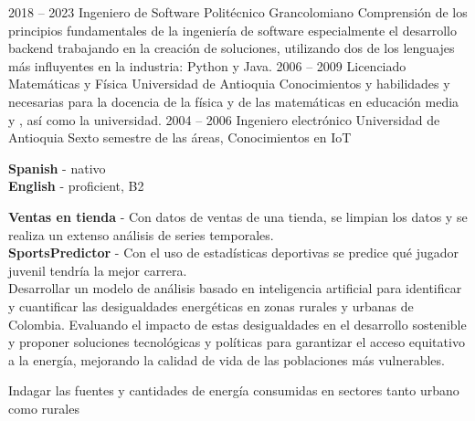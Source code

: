 \documentclass[9pt]{developercv} %
\begin{document}


\begin{entrylist}
	\entry
		{2018 -- 2023}
		{Ingeniero de Software}
		{Politécnico Grancolomiano}
		{Comprensión de los principios fundamentales de la ingeniería de software especialmente el desarrollo backend trabajando en la creación de soluciones, utilizando dos de los lenguajes más influyentes en la industria: Python y Java.}
	\entry
		{2006 -- 2009}
		{Licenciado Matemáticas y Física}
		{Universidad de Antioquia}
		{Conocimientos y habilidades y necesarias para la docencia de la física y de las matemáticas en educación media y , así como la universidad.  }
	\entry
		{2004 -- 2006}
		{Ingeniero electrónico}
		{Universidad de Antioquia }
		{Sexto semestre de las áreas, Conocimientos en IoT}
\end{entrylist}


\begin{minipage}[t]{0.4\textwidth}
	\vspace{-\baselineskip} %

	
	\textbf{Spanish} - nativo\\	
	\textbf{English} - proficient, B2\\
	
\end{minipage}
\hfill
\begin{minipage}[t]{0.6\textwidth}
	\vspace{-\baselineskip} %
	
	
	\textbf{Ventas en tienda} - Con datos de ventas de una tienda, se limpian los datos y se realiza un extenso análisis de series temporales. \\	
	
	\textbf{SportsPredictor} - Con el uso de estadísticas deportivas se predice qué jugador juvenil tendría la mejor carrera. \\
	
	Desarrollar un modelo de análisis basado en inteligencia artificial para identificar y cuantificar las desigualdades energéticas en zonas rurales y urbanas de Colombia. Evaluando el impacto de estas desigualdades en el desarrollo sostenible y proponer soluciones tecnológicas y políticas para garantizar el acceso equitativo a la energía, mejorando la calidad de vida de las poblaciones más vulnerables.
	
	Indagar las fuentes y cantidades de energía consumidas en sectores tanto urbano como rurales
	
\end{minipage}
\hfill

\end{document}
